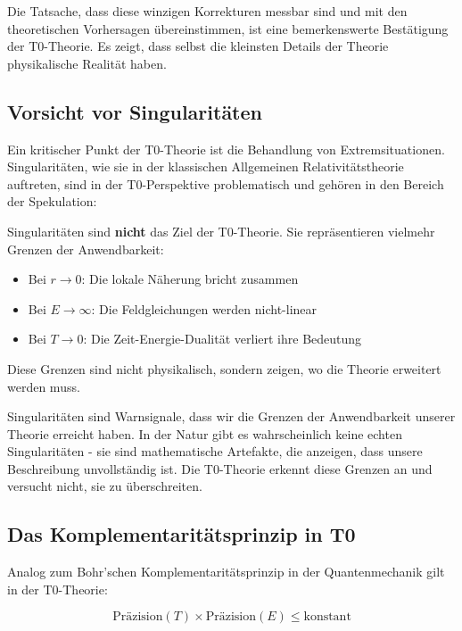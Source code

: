 \documentclass[12pt,a4paper]{article}
\begin{document}
	Die Tatsache, dass diese winzigen Korrekturen messbar sind und mit den theoretischen Vorhersagen übereinstimmen, ist eine bemerkenswerte Bestätigung der T0-Theorie. Es zeigt, dass selbst die kleinsten Details der Theorie physikalische Realität haben.
	
	\subsection{Vorsicht vor Singularitäten}
	
	Ein kritischer Punkt der T0-Theorie ist die Behandlung von Extremsituationen. Singularitäten, wie sie in der klassischen Allgemeinen Relativitätstheorie auftreten, sind in der T0-Perspektive problematisch und gehören in den Bereich der Spekulation:
	
	\begin{tcolorbox}[colback=t0yellow!10!white, colframe=t0yellow!75!black, title=Wichtige Einsicht]
		Singularitäten sind \textbf{nicht} das Ziel der T0-Theorie. Sie repräsentieren vielmehr Grenzen der Anwendbarkeit:
		\begin{itemize}
			\item Bei $r \to 0$: Die lokale Näherung bricht zusammen
			\item Bei $E \to \infty$: Die Feldgleichungen werden nicht-linear
			\item Bei $T \to 0$: Die Zeit-Energie-Dualität verliert ihre Bedeutung
		\end{itemize}
		Diese Grenzen sind nicht physikalisch, sondern zeigen, wo die Theorie erweitert werden muss.
	\end{tcolorbox}
	
	Singularitäten sind Warnsignale, dass wir die Grenzen der Anwendbarkeit unserer Theorie erreicht haben. In der Natur gibt es wahrscheinlich keine echten Singularitäten - sie sind mathematische Artefakte, die anzeigen, dass unsere Beschreibung unvollständig ist. Die T0-Theorie erkennt diese Grenzen an und versucht nicht, sie zu überschreiten.
	
	\subsection{Das Komplementaritätsprinzip in T0}
	
	Analog zum Bohr'schen Komplementaritätsprinzip in der Quantenmechanik gilt in der T0-Theorie:
	
	\begin{equation}
		\text{Präzision}(T) \times \text{Präzision}(E) \leq \text{konstant}
	\end{equation}
	
\end{document}
